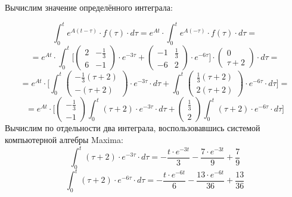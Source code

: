 Вычислим значение определённого интеграла:

\begin{displaymath}
\int_0^t e^{A(t - \tau)} \cdot f(\tau) \cdot d \tau = e^{At} \cdot \int_0^t e^{A(-\tau)} \cdot f(\tau) \cdot d \tau =
\end{displaymath}
\begin{displaymath}
= e^{At} \cdot \int_0^t \Big [ \begin{pmatrix}
2 & - \frac{1}{3}
\\
6 & -1
\end{pmatrix} \cdot e^{-3 \tau} + \begin{pmatrix}
-1 & \frac{1}{3}
\\
-6 & 2
\end{pmatrix} \cdot e^{-6 \tau} \Big ] \cdot \begin{pmatrix}
0
\\
\tau + 2
\end{pmatrix} \cdot d \tau =
\end{displaymath}
\begin{displaymath}
= e^{At} \cdot \Big [ \int_0^t \begin{pmatrix}
- \frac{1}{3} (\tau + 2)
\\
-(\tau + 2)
\end{pmatrix} \cdot e^{-3 \tau} \cdot d \tau + \int_0^t \begin{pmatrix}
\frac{1}{3} (\tau + 2)
\\
2 (\tau + 2)
\end{pmatrix} \cdot e^{-6 \tau} \cdot d \tau \Big ] = 
\end{displaymath}
\begin{displaymath}
= e^{At} \cdot \Big [  \begin{pmatrix}
- \frac{1}{3}
\\
- 1
\end{pmatrix} \int_0^t (\tau + 2) \cdot e^{-3 \tau} \cdot d \tau + \begin{pmatrix}
\frac{1}{3}
\\
2 
\end{pmatrix} \int_0^t (\tau + 2) \cdot e^{-6 \tau} \cdot d \tau \Big ]
\end{displaymath}
Вычислим по отдельности два интеграла, воспользовавшись системой компьютерной алгебры Maxima:
\begin{displaymath}
\int_0^t (\tau + 2) \cdot e^{-3 \tau} \cdot d \tau = - \frac{t \cdot e^{-3t}}{3} - \frac{7 \cdot e^{-3t}}{9} + \frac{7}{9}
\end{displaymath}
\begin{displaymath}
\int_0^t (\tau + 2) \cdot e^{-6 \tau} \cdot d \tau = - \frac{t \cdot e^{-6t}}{6} - \frac{13 \cdot e^{-6t}}{36} + \frac{13}{36}
\end{displaymath}

